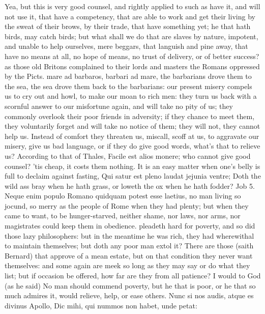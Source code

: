{Yea, but this is very good counsel, and rightly applied to such as have
it, and will not use it, that have a competency, that are able to work
and get their living by the sweat of their brows, by their trade, that
have something yet; he that hath birds, may catch birds; but what shall
we do that are slaves by nature, impotent, and unable to help
ourselves, mere beggars, that languish and pine away, that have no
means at all, no hope of means, no trust of delivery, or of better
success? as those old Britons complained to their lords and masters the
Romans oppressed by the Picts. mare ad barbaros, barbari ad mare, the
barbarians drove them to the sea, the sea drove them back to the
barbarians: our present misery compels us to cry out and howl, to make
our moan to rich men: they turn us back with a scornful answer to our
misfortune again, and will take no pity of us; they commonly overlook
their poor friends in adversity; if they chance to meet them, they
voluntarily forget and will take no notice of them; they will not, they
cannot help us. Instead of comfort they threaten us, miscall, scoff at
us, to aggravate our misery, give us bad language, or if they do give
good words, what's that to relieve us? According to that of Thales,
Facile est alios monere; who cannot give good counsel? 'tis cheap, it
costs them nothing. It is an easy matter when one's belly is full to
declaim against fasting, Qui satur est pleno laudat jejunia ventre;
Doth the wild ass bray when he hath grass, or loweth the ox when he
hath fodder? Job  5. Neque enim populo Romano quidquam potest
esse laetius, no man living so jocund, so merry as the people of Rome
when they had plenty; but when they came to want, to be hunger-starved,
neither shame, nor laws, nor arms, nor magistrates could keep them in
obedience. \Seneca pleadeth hard for poverty, and so did those lazy
philosophers: but in the meantime he was rich, they had
wherewithal to maintain themselves; but doth any poor man extol it?
There are those (saith  Bernard) that approve of a mean estate,
but on that condition they never want themselves: and some again are
meek so long as they may say or do what they list; but if occasion be
offered, how far are they from all patience? I would to God (as he
said) No man should commend poverty, but he that is poor, or he
that so much admires it, would relieve, help, or ease others.
Nunc si nos audis, atque es divinus Apollo,
Dic mihi, qui nummos non habet, unde petat:

}
